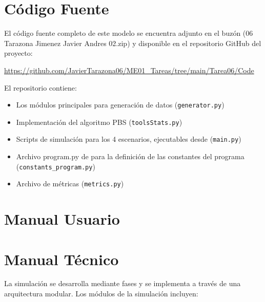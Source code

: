 \documentclass{article}
\begin{document}
\section{Código Fuente}\label{sec:cod}

El código fuente completo de este modelo se encuentra adjunto en el buzón 
(06 Tarazona Jimenez Javier Andres 02.zip)
y disponible en el repositorio GitHub del proyecto:

\begin{center}
\url{https://github.com/JavierTarazona06/ME01_Tareas/tree/main/Tarea06/Code}
\end{center}

El repositorio contiene:
\begin{itemize}
\item Los módulos principales para generación de datos (\texttt{generator.py})
\item Implementación del algoritmo PBS (\texttt{toolsStats.py})
\item Scripts de simulación para los 4 escenarios, ejecutables desde (\texttt{main.py})
\item Archivo program.py de para la definición de las constantes del programa 
    (\texttt{constants\_program.py})
\item Archivo de métricas (\texttt{metrics.py})
\end{itemize}


\section{Manual Usuario}\label{sec:man_u}



\section{Manual Técnico}\label{sec:man_t}

La simulación se desarrolla mediante fases y se implementa a través de una 
arquitectura modular. Los módulos de la simulación incluyen:
\end{document}
